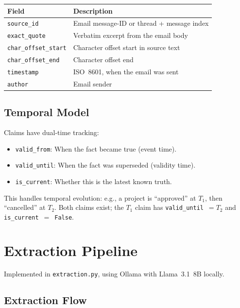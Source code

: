 \documentclass[11pt,a4paper]{article}
\begin{document}
\begin{center}
\begin{tabular}{ll}
\toprule
\textbf{Field} & \textbf{Description} \\
\midrule
\texttt{source\_id} & Email message-ID or thread + message index \\
\texttt{exact\_quote} & Verbatim excerpt from the email body \\
\texttt{char\_offset\_start} & Character offset start in source text \\
\texttt{char\_offset\_end} & Character offset end \\
\texttt{timestamp} & ISO~8601, when the email was sent \\
\texttt{author} & Email sender \\
\bottomrule
\end{tabular}
\end{center}

\subsection{Temporal Model}
Claims have dual-time tracking:
\begin{itemize}[nosep]
    \item \texttt{valid\_from}: When the fact became true (event time).
    \item \texttt{valid\_until}: When the fact was superseded (validity time).
    \item \texttt{is\_current}: Whether this is the latest known truth.
\end{itemize}

This handles temporal evolution: e.g., a project is ``approved'' at $T_1$, then ``cancelled'' at $T_2$. Both claims exist; the $T_1$ claim has \texttt{valid\_until}~$= T_2$ and \texttt{is\_current}~$=$~\texttt{False}.

\section{Extraction Pipeline}

Implemented in \texttt{extraction.py}, using Ollama with Llama~3.1~8B locally.

\subsection{Extraction Flow}
\end{document}
